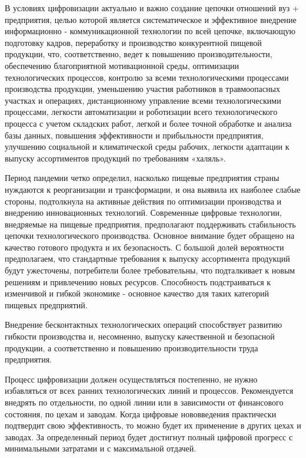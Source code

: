 \begin{multicols}{2}
В условиях цифровизации актуально и важно создание цепочки отношений вуз
+ предприятия, целью которой является систематическое и эффективное
внедрение информационно - коммуникационной технологии по всей цепочке,
включающую подготовку кадров, переработку и производство конкурентной
пищевой продукции, что, соответственно, ведет к повышению
производительности, обеспечению благоприятной мотивационной среды,
оптимизации технологических процессов, контролю за всеми
технологическими процессами производства продукции, уменьшению участия
работников в травмоопасных участках и операциях, дистанционному
управление всеми технологическими процессами, легкости автоматизации и
роботизации всего технологического процесса с учетом складских работ,
легкой и более точной обработке и анализа базы данных, повышения
эффективности и прибыльности предприятия, улучшению социальной и
климатической среды рабочих, легкости адаптации к выпуску ассортиментов
продукций по требованиям «халяль».

Период пандемии четко определил, насколько пищевые предприятия страны
нуждаются к реорганизации и трансформации, и она выявила их наиболее
слабые стороны, подтолкнула на активные действия по оптимизации
производства и внедрению инновационных технологий. Современные цифровые
технологии, внедряемые на пищевые предприятия, предполагают поддерживать
стабильность цепочки технологического производства. Основное внимание
будет обращено на качество готового продукта и их безопасность. С
большой долей вероятности предполагаем, что стандартные требования к
выпуску ассортимента продукций будут ужесточены, потребители более
требовательны, что подталкивает к новым решениям и привлечению новых
ресурсов. Способность подстраиваться к изменчивой и гибкой экономике -
основное качество для таких категорий пищевых предприятий.

Внедрение бесконтактных технологических операций способствует развитию
гибкости производства и, несомненно, выпуску качественной и безопасной
продукции, а соответственно и повышению производительности труда
предприятия.

Процесс цифровизации должен осуществляться постепенно, не нужно
избавляться от всех ранних технологических линий и процессов.
Рекомендуется внедрять по отдельности, по одной линии или в зависимости
от финансового состояния, по цехам и заводам. Когда цифровые
нововведения практически подтвердит свою эффективность, то можно будет
их применение в других цехах и заводах. За определенный период будет
достигнут полный цифровой прогресс с минимальными затратами и с
максимальной отдачей.


\end{multicols}
